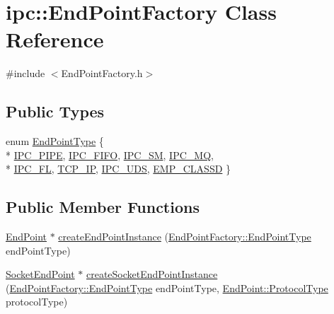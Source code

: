 \hypertarget{classipc_1_1EndPointFactory}{}\section{ipc\+:\+:End\+Point\+Factory Class Reference}
\label{classipc_1_1EndPointFactory}


{\ttfamily \#include $<$End\+Point\+Factory.\+h$>$}

\subsection*{Public Types}
\begin{DoxyCompactItemize}
\item 
enum \hyperlink{classipc_1_1EndPointFactory_a436d6caf00a27aa28ca00bf116edca04}{End\+Point\+Type} \{ \\*
\hyperlink{classipc_1_1EndPointFactory_a436d6caf00a27aa28ca00bf116edca04ab4f2febf223e7103da442bcfe346789e}{I\+P\+C\+\_\+\+P\+I\+PE}, 
\hyperlink{classipc_1_1EndPointFactory_a436d6caf00a27aa28ca00bf116edca04aed25e2f8890e6f5c9a8b9b7215e378c0}{I\+P\+C\+\_\+\+F\+I\+FO}, 
\hyperlink{classipc_1_1EndPointFactory_a436d6caf00a27aa28ca00bf116edca04a8fa11a5e2ed1da22c16c97c530938cfa}{I\+P\+C\+\_\+\+SM}, 
\hyperlink{classipc_1_1EndPointFactory_a436d6caf00a27aa28ca00bf116edca04a07dfcba7770e093e86cb7e5fb5152827}{I\+P\+C\+\_\+\+MQ}, 
\\*
\hyperlink{classipc_1_1EndPointFactory_a436d6caf00a27aa28ca00bf116edca04a1e79496cd773f3410e261313944bf341}{I\+P\+C\+\_\+\+FL}, 
\hyperlink{classipc_1_1EndPointFactory_a436d6caf00a27aa28ca00bf116edca04af75cb0d4978f6067d53e887816c54c1c}{T\+C\+P\+\_\+\+IP}, 
\hyperlink{classipc_1_1EndPointFactory_a436d6caf00a27aa28ca00bf116edca04a53908264697bf3f606c27b77728dc80d}{I\+P\+C\+\_\+\+U\+DS}, 
\hyperlink{classipc_1_1EndPointFactory_a436d6caf00a27aa28ca00bf116edca04a4aef5054db3eecc660ec639e68b1346d}{E\+M\+P\+\_\+\+C\+L\+A\+S\+SD}
 \}
\end{DoxyCompactItemize}
\subsection*{Public Member Functions}
\begin{DoxyCompactItemize}
\item 
\hyperlink{classipc_1_1EndPoint}{End\+Point} $\ast$ \hyperlink{classipc_1_1EndPointFactory_a033e956410419b063d5074f4cd541048}{create\+End\+Point\+Instance} (\hyperlink{classipc_1_1EndPointFactory_a436d6caf00a27aa28ca00bf116edca04}{End\+Point\+Factory\+::\+End\+Point\+Type} end\+Point\+Type)
\item 
\hyperlink{classipc_1_1SocketEndPoint}{Socket\+End\+Point} $\ast$ \hyperlink{classipc_1_1EndPointFactory_a88cee65bcd3d20262fc289e0c61c1b2e}{create\+Socket\+End\+Point\+Instance} (\hyperlink{classipc_1_1EndPointFactory_a436d6caf00a27aa28ca00bf116edca04}{End\+Point\+Factory\+::\+End\+Point\+Type} end\+Point\+Type, \hyperlink{classipc_1_1EndPoint_adcdf30d3a61d3d342529b1fb8b0bbd72}{End\+Point\+::\+Protocol\+Type} protocol\+Type)
\end{DoxyCompactItemize}
